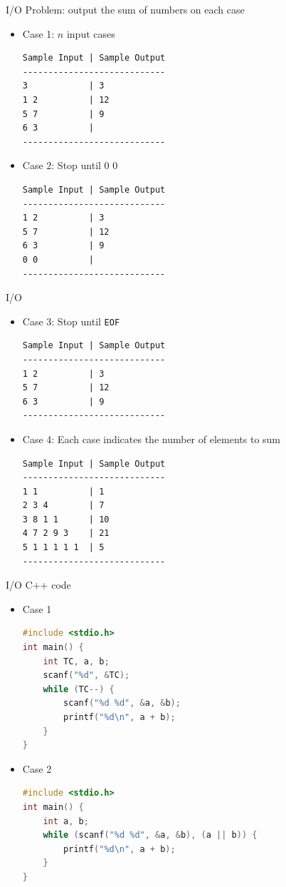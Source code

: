 \documentclass{beamer}
\begin{document}
\begin{frame}[fragile]{I/O}
Problem: output the sum of numbers on each case
\begin{itemize}
    \item Case 1: $n$ input cases
\begin{lstlisting}
Sample Input | Sample Output
----------------------------
3            | 3
1 2          | 12
5 7          | 9
6 3          |
----------------------------
\end{lstlisting}
    \item Case 2: Stop until $0$ $0$
\begin{lstlisting}
Sample Input | Sample Output
----------------------------
1 2          | 3
5 7          | 12
6 3          | 9
0 0          |
----------------------------
\end{lstlisting}
\end{itemize}
\end{frame}

\begin{frame}[fragile]{I/O}
    \begin{itemize}
        \item Case 3: Stop until \verb|EOF|
\begin{lstlisting}
Sample Input | Sample Output
----------------------------
1 2          | 3
5 7          | 12
6 3          | 9
----------------------------
\end{lstlisting}
        \item Case 4: Each case indicates the number of elements to sum
\begin{lstlisting}
Sample Input | Sample Output
----------------------------
1 1          | 1
2 3 4        | 7
3 8 1 1      | 10
4 7 2 9 3    | 21
5 1 1 1 1 1  | 5
----------------------------
\end{lstlisting}
    \end{itemize}
\end{frame}

\begin{frame}[fragile]{I/O C++ code}
    \begin{itemize}
        \item Case 1
\begin{lstlisting}[language=c++]
#include <stdio.h>
int main() {
	int TC, a, b;
	scanf("%d", &TC);
	while (TC--) {
		scanf("%d %d", &a, &b);
		printf("%d\n", a + b);
	}
}
\end{lstlisting}
        \item Case 2
\begin{lstlisting}[language=c++]
#include <stdio.h>
int main() {
	int a, b;
	while (scanf("%d %d", &a, &b), (a || b)) {
		printf("%d\n", a + b);
	}
}
\end{lstlisting}
    \end{itemize}
\end{frame}
\end{document}
